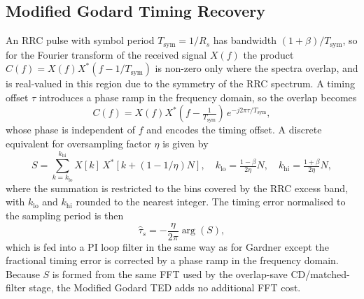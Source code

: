 \documentclass[12pt,a4paper]{report}
\begin{document}
\subsection{Modified Godard Timing Recovery}
An RRC pulse with symbol period $T_\mathrm{sym} = 1/R_s$ has bandwidth $(1+\beta)/T_\mathrm{sym}$, so for the Fourier transform of the received signal $X(f)$ the product $C(f) = X(f)X^*(f-1/T_\mathrm{sym})$ is non-zero only where the spectra overlap, and is real-valued in this region due to the symmetry of the RRC spectrum. A timing offset $\tau$ introduces a phase ramp in the frequency domain, so the overlap becomes
\begin{equation}
    C(f) = X(f)X^*\!\left(f-\tfrac{1}{T_\mathrm{sym}}\right)\,e^{-j2\pi\tau/T_\mathrm{sym}},
\end{equation}
whose phase is independent of $f$ and encodes the timing offset. A discrete equivalent for oversampling factor $\eta$ is given by \cite{Josten;17}
\begin{equation}
    S = \sum_{k=k_\mathrm{lo}}^{k_\mathrm{hi}} X[k]\,X^*[k + (1-1/\eta)N], \quad k_\mathrm{lo} = \tfrac{1-\beta}{2\eta}N, \quad k_\mathrm{hi} = \tfrac{1+\beta}{2\eta}N,
    \label{eq:godard_sum}
\end{equation}
where the summation is restricted to the bins covered by the RRC excess band, with $k_\mathrm{lo}$ and $k_\mathrm{hi}$ rounded to the nearest integer. The timing error normalised to the sampling period is then
\begin{equation}
    \hat{\tau}_s = -\frac{\eta}{2\pi}\arg(S),
    \label{eq:godard_est}
\end{equation}
which is fed into a PI loop filter in the same way as for Gardner except the fractional timing error is corrected by a phase ramp in the frequency domain. Because $S$ is formed from the same FFT used by the overlap-save CD/matched-filter stage, the Modified Godard TED adds no additional FFT cost.
\end{document}
